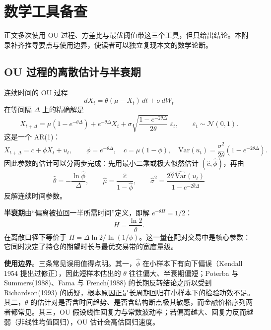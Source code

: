\appendix

\section{数学工具备查}\label{sec:appendix}

正文多次使用 OU 过程、方差比与最优阈值带这三个工具，但只给出结论。本附录补齐推导要点与使用边界，使读者可以独立复现本文的数学论断。

\subsection{OU 过程的离散估计与半衰期}

连续时间的 OU 过程
\begin{equation}
dX_t=\theta(\mu-X_t)\,dt+\sigma\,dW_t
\end{equation}
在等间隔 $\Delta$ 上的精确解是
\begin{equation}
X_{t+\Delta}=\mu\left(1-e^{-\theta\Delta}\right)+e^{-\theta\Delta}X_t
+\sigma\sqrt{\frac{1-e^{-2\theta\Delta}}{2\theta}}\;\varepsilon_t,\qquad
\varepsilon_t\sim \mathcal N(0,1).
\end{equation}
这是一个 AR(1)：
\begin{equation}
X_{t+\Delta}=c+\phi X_t+u_t,\qquad
\phi=e^{-\theta\Delta},\quad
c=\mu(1-\phi),\quad
\mathrm{Var}(u_t)=\frac{\sigma^2}{2\theta}\left(1-e^{-2\theta\Delta}\right).
\end{equation}
因此参数的估计可以分两步完成：先用最小二乘或极大似然估计 $(\hat c,\hat\phi)$，再由
\begin{equation}
\hat\theta=-\frac{\ln\hat\phi}{\Delta},\qquad
\hat\mu=\frac{\hat c}{1-\hat\phi},\qquad
\hat\sigma^2=\frac{2\hat\theta\,\widehat{\mathrm{Var}}(u_t)}{1-e^{-2\hat\theta\Delta}}
\end{equation}
反解连续时间参数。

\textbf{半衰期}由“偏离被拉回一半所需时间”定义，即解 $e^{-\theta H}=1/2$：
\begin{equation}
H=\frac{\ln 2}{\theta}.
\end{equation}
在离散口径下等价于 $H=\Delta\ln2/\ln(1/\phi)$。这一量在配对交易中是核心参数：它同时决定了持仓的期望时长与最优交易带的宽度量级。

\textbf{使用边界}。三条常见误用值得点明。其一，$\hat\phi$ 在小样本下有向下偏误（Kendall 1954 提出过修正），因此短样本估出的 $\theta$ 往往偏大、半衰期偏短；Poterba 与 Summers(1988)、Fama 与 French(1988) 的长期反转结论之所以受到 Richardson(1993) 的质疑，根本原因正是长周期回归在小样本下的检验功效不足\cite{poterbsummers1988,famafrench1988,richardson1993}。其二，$\theta$ 的估计对是否含时间趋势、是否含结构断点极其敏感，而金融价格序列两者都常见。其三，OU 假设线性回复力与常数波动率；若偏离越大、回复力反而越弱（非线性均值回归），OU 估计会高估回归速度。

